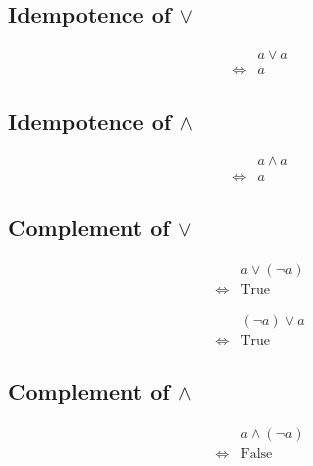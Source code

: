 \subsection{Idempotence of $\lor$}
\begin{prop}
\label{Proposition:lor_idempotence}
\begin{align*}
& a \lor a \\
\iff & a
\end{align*}
\end{prop}

\subsection{Idempotence of $\land$}
\begin{prop}
\label{Proposition:land_idempotence}
\begin{align*}
& a \land a \\
\iff & a
\end{align*}
\end{prop}

\subsection{Complement of $\lor$}
\begin{prop}
\label{Proposition:lor_complement_1}
\begin{align*}
& a \lor (\lnot a) \\
\iff & \text{True}
\end{align*}
\end{prop}

\begin{prop}
\label{Proposition:lor_complement_2}
\begin{align*}
& (\lnot a) \lor a \\
\iff & \text{True}
\end{align*}
\end{prop}

\subsection{Complement of $\land$}
\begin{prop}
\label{Proposition:land_complement_1}
\begin{align*}
& a \land (\lnot a) \\
\iff & \text{False}
\end{align*}
\end{prop}

